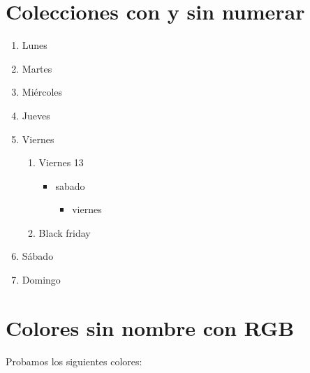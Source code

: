 \documentclass[10pt,a4paper]{article}
\begin{document}
\section{Colecciones con y sin numerar}
\begin{enumerate}
		\item Lunes
		\item Martes
		\item Miércoles
		\item Jueves
		\item Viernes
			\begin{enumerate}
				\item Viernes 13
					\begin{itemize}
						\item sabado
							\begin{itemize}
								\item viernes		
							\end{itemize}
					\end{itemize}
				\item Black friday
			\end{enumerate}
		\item Sábado
		\item Domingo
	\end{enumerate}
\section{Colores sin nombre con RGB}

Probamos los siguientes colores:
	\begin{itemize}
		\item \textcolor[rgb]{0,1,0}{verde}
		\item \textcolor[rgb]{1,1,0}{amarillo
	\end{itemize}
\end{document}
